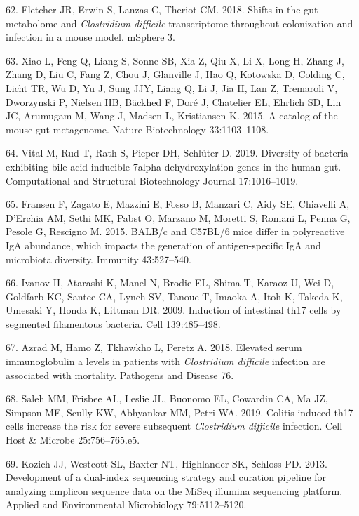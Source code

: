 \documentclass[
  11pt,
]{article}
\begin{document}
\leavevmode\hypertarget{ref-Fletcher2018}{}%
62. Fletcher JR, Erwin S, Lanzas C, Theriot CM. 2018. Shifts in the gut
metabolome and \emph{Clostridium difficile} transcriptome throughout
colonization and infection in a mouse model. mSphere 3.

\leavevmode\hypertarget{ref-Xiao2015}{}%
63. Xiao L, Feng Q, Liang S, Sonne SB, Xia Z, Qiu X, Li X, Long H, Zhang
J, Zhang D, Liu C, Fang Z, Chou J, Glanville J, Hao Q, Kotowska D,
Colding C, Licht TR, Wu D, Yu J, Sung JJY, Liang Q, Li J, Jia H, Lan Z,
Tremaroli V, Dworzynski P, Nielsen HB, Bäckhed F, Doré J, Chatelier EL,
Ehrlich SD, Lin JC, Arumugam M, Wang J, Madsen L, Kristiansen K. 2015. A
catalog of the mouse gut metagenome. Nature Biotechnology 33:1103--1108.

\leavevmode\hypertarget{ref-Vital2019}{}%
64. Vital M, Rud T, Rath S, Pieper DH, Schlüter D. 2019. Diversity of
bacteria exhibiting bile acid-inducible 7alpha-dehydroxylation genes in
the human gut. Computational and Structural Biotechnology Journal
17:1016--1019.

\leavevmode\hypertarget{ref-Fransen2015}{}%
65. Fransen F, Zagato E, Mazzini E, Fosso B, Manzari C, Aidy SE,
Chiavelli A, D'Erchia AM, Sethi MK, Pabst O, Marzano M, Moretti S,
Romani L, Penna G, Pesole G, Rescigno M. 2015. BALB/c and C57BL/6 mice
differ in polyreactive IgA abundance, which impacts the generation of
antigen-specific IgA and microbiota diversity. Immunity 43:527--540.

\leavevmode\hypertarget{ref-Ivanov2009}{}%
66. Ivanov II, Atarashi K, Manel N, Brodie EL, Shima T, Karaoz U, Wei D,
Goldfarb KC, Santee CA, Lynch SV, Tanoue T, Imaoka A, Itoh K, Takeda K,
Umesaki Y, Honda K, Littman DR. 2009. Induction of intestinal th17 cells
by segmented filamentous bacteria. Cell 139:485--498.

\leavevmode\hypertarget{ref-Azrad2018}{}%
67. Azrad M, Hamo Z, Tkhawkho L, Peretz A. 2018. Elevated serum
immunoglobulin a levels in patients with \emph{Clostridium difficile}
infection are associated with mortality. Pathogens and Disease 76.

\leavevmode\hypertarget{ref-Saleh2019}{}%
68. Saleh MM, Frisbee AL, Leslie JL, Buonomo EL, Cowardin CA, Ma JZ,
Simpson ME, Scully KW, Abhyankar MM, Petri WA. 2019. Colitis-induced
th17 cells increase the risk for severe subsequent \emph{Clostridium
difficile} infection. Cell Host \& Microbe 25:756--765.e5.

\leavevmode\hypertarget{ref-Kozich2013}{}%
69. Kozich JJ, Westcott SL, Baxter NT, Highlander SK, Schloss PD. 2013.
Development of a dual-index sequencing strategy and curation pipeline
for analyzing amplicon sequence data on the MiSeq illumina sequencing
platform. Applied and Environmental Microbiology 79:5112--5120.
\end{document}
